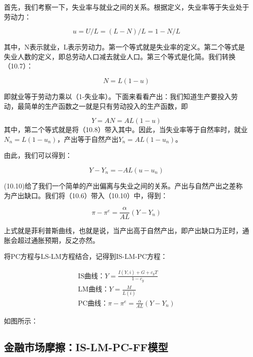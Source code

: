 \documentclass[cn,12pt,math=newtx,citestyle=gb7714-2015,bibstyle=gb7714-2015]{elegantbook}
\begin{document}
首先，我们考察一下，失业率与就业之间的关系。根据定义，失业率等于失业处于劳动力：

\begin{equation}
	u = U / L = (L - N) / L = 1-N/L
\end{equation}
	
	其中，N表示就业，L表示劳动力。第一个等式就是失业率的定义。第二个等式是失业人数的定义，即总劳动人口减去就业人口。第三个等式是化简。我们转换（10.7）：
	
	\begin{equation}
		N = L(1-u)
	\end{equation}
	
	即就业等于劳动力乘以（1-失业率）。下面来看看产出：我们知道生产要投入劳动，最简单的生产函数之一就是只有劳动投入的生产函数，即
	
	\begin{equation}
		Y=AN =AL(1-u)
	\end{equation}
	其中，第二个等式就是将（10.8）带入其中。因此，当失业率等于自然率时，就业$N_n=L(1-u_n)$，产出等于自然产出$Y_n =AL(1-u_n)$。
	
	由此，我们可以得到：
	
	\begin{equation}
		Y -Y_n = -AL(u-u_n)
	\end{equation}
	
	(10.10)给了我们一个简单的产出偏离与失业之间的关系。产出与自然产出之差称为产出缺口。我们将（10.6）带入（10.10）中，得到：
	
	\begin{equation}
		\pi -\pi^e = \frac{\alpha}{ AL} (Y -Y_n)
	\end{equation}
	
	上式就是菲利普斯曲线，也就是说，当产出高于自然产出，即产出缺口为正时，通胀会超过通胀预期，反之亦然。
	
	将PC方程与LS-LM方程结合，记得到IS-LM-PC方程：
	
	
		\begin{equation}
		\begin{array}{l}
			\text{IS曲线：}   Y = \frac{I(Y,i)+G+c_y T}{1-c_y}\\
			\text{LM曲线：}     Y=\frac{M}{L(i)}\\
				\text{PC曲线：}   \pi -\pi^e = \frac{\alpha}{ AL} (Y -Y_n)
		\end{array}
	\end{equation}
	
	
	如图所示：
	
	
	
	
	\subsection{金融市场摩擦：IS-LM-PC-FF模型}
	
\end{document}
